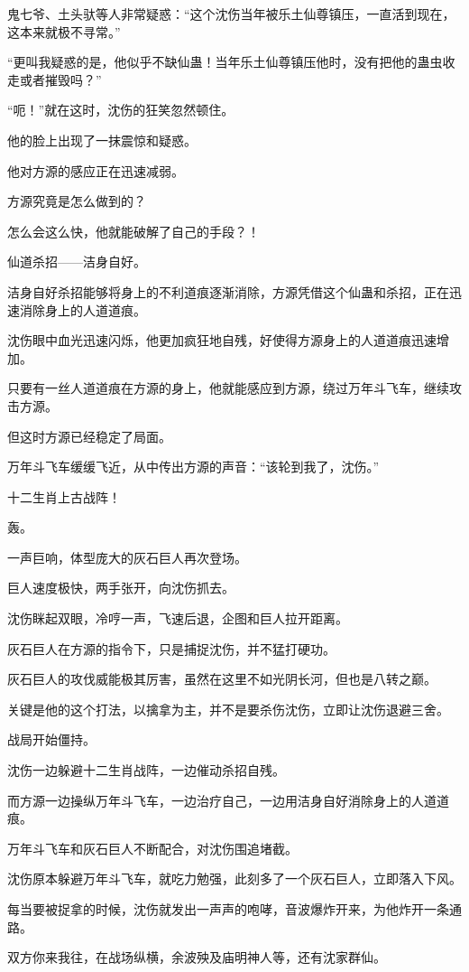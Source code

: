 \begin{this_body}
鬼七爷、土头驮等人非常疑惑：“这个沈伤当年被乐土仙尊镇压，一直活到现在，这本来就极不寻常。”

“更叫我疑惑的是，他似乎不缺仙蛊！当年乐土仙尊镇压他时，没有把他的蛊虫收走或者摧毁吗？”

“呃！”就在这时，沈伤的狂笑忽然顿住。

他的脸上出现了一抹震惊和疑惑。

他对方源的感应正在迅速减弱。

方源究竟是怎么做到的？

怎么会这么快，他就能破解了自己的手段？！

仙道杀招——洁身自好。

洁身自好杀招能够将身上的不利道痕逐渐消除，方源凭借这个仙蛊和杀招，正在迅速消除身上的人道道痕。

沈伤眼中血光迅速闪烁，他更加疯狂地自残，好使得方源身上的人道道痕迅速增加。

只要有一丝人道道痕在方源的身上，他就能感应到方源，绕过万年斗飞车，继续攻击方源。

但这时方源已经稳定了局面。

万年斗飞车缓缓飞近，从中传出方源的声音：“该轮到我了，沈伤。”

十二生肖上古战阵！

轰。

一声巨响，体型庞大的灰石巨人再次登场。

巨人速度极快，两手张开，向沈伤抓去。

沈伤眯起双眼，冷哼一声，飞速后退，企图和巨人拉开距离。

灰石巨人在方源的指令下，只是捕捉沈伤，并不猛打硬功。

灰石巨人的攻伐威能极其厉害，虽然在这里不如光阴长河，但也是八转之巅。

关键是他的这个打法，以擒拿为主，并不是要杀伤沈伤，立即让沈伤退避三舍。

战局开始僵持。

沈伤一边躲避十二生肖战阵，一边催动杀招自残。

而方源一边操纵万年斗飞车，一边治疗自己，一边用洁身自好消除身上的人道道痕。

万年斗飞车和灰石巨人不断配合，对沈伤围追堵截。

沈伤原本躲避万年斗飞车，就吃力勉强，此刻多了一个灰石巨人，立即落入下风。

每当要被捉拿的时候，沈伤就发出一声声的咆哮，音波爆炸开来，为他炸开一条通路。

双方你来我往，在战场纵横，余波殃及庙明神人等，还有沈家群仙。


\end{this_body}
